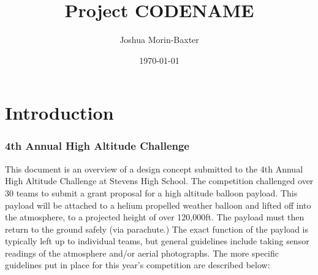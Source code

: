 \documentclass[english]{report}
\title{Project CODENAME}
\author{Joshua Morin-Baxter}
\date{\today}
\begin{document}
\newcommand{\amountofheliumtobeused}{142 }

\maketitle

\tableofcontents


\part{Introduction}

\begin{appendix}
  \listoffigures
  \listoftables
\end{appendix}

\newpage

\section{4th Annual High Altitude Challenge}
This document is an overview of a design concept submitted to the
4th Annual High Altitude Challenge at Stevens High School. The competition
challenged over 30 teams to submit a grant proposal for a high altitude
balloon payload. This payload will be attached to a helium propelled weather balloon and lifted off into the atmosphere, to a projected height of over 120,000ft.  The payload must then return to the ground safely (via parachute.)  The exact function of the payload is typically left up to individual teams, but general guidelines include taking sensor readings of the atmosphere and/or aerial photographs.  The more specific guidelines put in place for this year's competition are described below:
\end{document}

